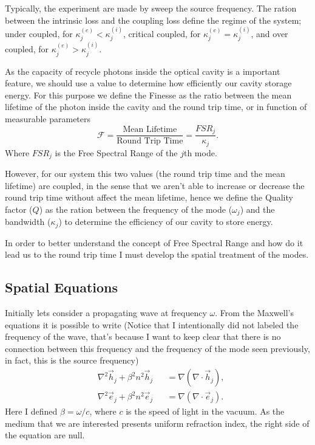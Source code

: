 Typically, the experiment are made by sweep the source frequency. The ration between the intrinsic loss and the coupling loss define the regime of the system; under coupled, for $\kappa_j^{(e)} < \kappa_j^{(i)}$, critical coupled, for $\kappa_j^{(e)} = \kappa_j^{(i)}$, and over coupled, for $\kappa_j^{(e)} > \kappa_j^{(i)}$. 

As the capacity of recycle photons inside the optical cavity is a important feature, we should use a value to determine how efficiently our cavity storage energy. For this purpose we define the Finesse as the ratio between the mean lifetime of the photon inside the cavity and the round trip time, or in function of measurable parameters 
\begin{equation}
    \mathcal{F} = \frac{\text{Mean Lifetime}}{\text{Round Trip Time}} = \frac{FSR_j}{\kappa_j}.
\end{equation}
Where $FSR_j$ is the Free Spectral Range of the $j$th mode.

However, for our system this two values (the round trip time and the mean lifetime) are coupled, in the sense that we aren't able to increase or decrease the round trip time without affect the mean lifetime, hence we define the Quality factor ($Q$) as the ration between the frequency of the mode ($\omega_j$) and the bandwidth ($\kappa_j$) to determine the efficiency of our cavity to store energy. 

In order to better understand the concept of Free Spectral Range and how do it lead us to the round trip time I must develop the spatial treatment of the modes. 

\subsection{Spatial Equations}

Initially lets consider a propagating wave at frequency $\omega$. From the Maxwell's equations it is possible to write (Notice that I intentionally did not labeled the frequency of the wave, that's because I want to keep clear that there is no connection between this frequency and the frequency of the mode seen previously, in fact, this is the source frequency) 
\begin{subequations}
    \begin{alignat}{2}
    &\nabla^2\vec{h}_j+\beta^2n^2\vec{h}_j &&= \nabla(\nabla\cdot\vec{h}_j),\\
    &\nabla^2\vec{e}_j+\beta^2n^2\vec{e}_j &&= \nabla(\nabla\cdot\vec{e}_j).
    \end{alignat}
    \label{eq:wave_eq_full}
\end{subequations}
Here I defined $\beta = \omega/c$, where $c$ is the speed of light in the vacuum. As the medium that we are interested presents uniform refraction index, the right side of the equation are null. 

